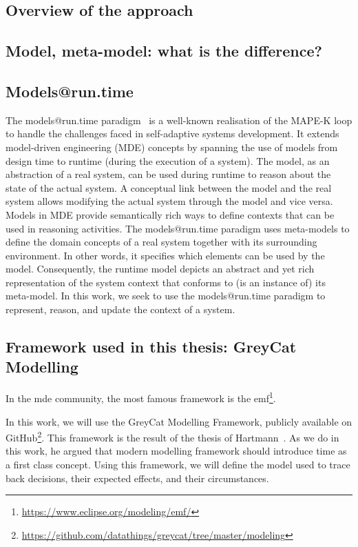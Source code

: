 
\subsection{Overview of the approach}


\subsection{Model, meta-model: what is the difference?}

\subsection{Models@run.time}
The models@run.time paradigm~\cite{DBLP:journals/computer/MorinBJFS09,DBLP:journals/computer/BlairBF09} is a well-known realisation of the MAPE-K loop to handle the challenges faced in self-adaptive systems development.
It extends model-driven engineering (MDE) concepts by spanning the use of models from design time to runtime (\ie during the execution of a system).
The model, as an abstraction of a real system, can be used during runtime to reason about the state of the actual system. 
A conceptual link between the model and the real system allows modifying the actual system through the model and vice versa.
Models in MDE provide semantically rich ways to define contexts that can be used in reasoning activities. 
The models@run.time paradigm uses meta-models to define the domain concepts of a real system together with its surrounding environment. 
In other words, it specifies which elements can be used by the model.
Consequently, the runtime model depicts an abstract and yet rich representation of the system context that conforms to (is an instance of) its meta-model.
In this work, we seek to use the models@run.time paradigm to represent, reason, and update the context of a system.

\subsection{Framework used in this thesis: GreyCat Modelling}

 
In the \gls{mde} community, the most famous framework is the \gls{emf}\footnote{\url{https://www.eclipse.org/modeling/emf/}}\cite{steinberg2008emf}.



In this work, we will use the GreyCat Modelling Framework, publicly available on GitHub\footnote{\url{https://github.com/datathings/greycat/tree/master/modeling}}.
This framework is the result of the thesis of Hartmann~\cite{}.
As we do in this work, he argued that modern modelling framework should introduce time as a first class concept.
Using this framework, we will define the model used to trace back decisions, their expected effects, and their circumstances.
